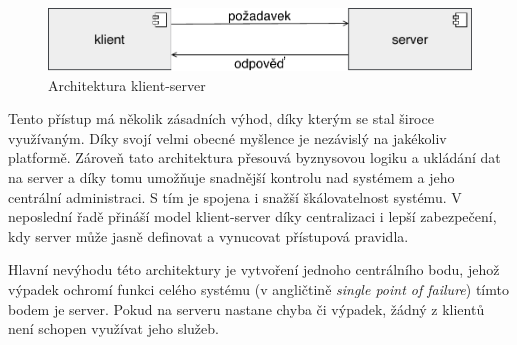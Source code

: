 \begin{figure}[t]
    \centering
    \includegraphics[keepaspectratio=true, width=0.6\linewidth]{figures/client-server.pdf}
    \caption{Architektura klient-server}
    \label{fig:client-server}
\end{figure}


Tento přístup má několik zásadních výhod, díky kterým se stal
široce využívaným. Díky svojí velmi obecné myšlence je nezávislý
na jakékoliv platformě.
Zároveň tato architektura přesouvá byznysovou logiku a
ukládání dat na server a díky tomu umožňuje
snadnější kontrolu nad systémem a jeho centrální administraci. S tím
je spojena i snažší škálovatelnost systému. V neposlední řadě
přináší model klient-server díky centralizaci i lepší zabezpečení,
kdy server může jasně definovat a vynucovat přístupová pravidla.

Hlavní nevýhodu této architektury je vytvoření jednoho centrálního bodu,
jehož výpadek ochromí funkci celého systému (v angličtině
\textit{single point of failure}) \textendash\xspace tímto bodem je server.
Pokud na serveru nastane chyba či výpadek, žádný z klientů není schopen využívat
jeho služeb.


